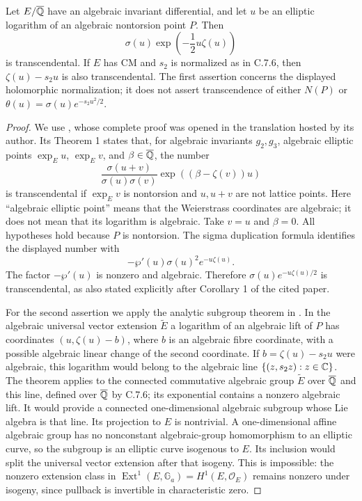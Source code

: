 \begin{statement}
Let $E/\overline{\mathbb Q}$ have an algebraic invariant differential,
and let $u$ be an elliptic logarithm of an algebraic nontorsion
point $P$. Then
\[
 \sigma(u)\exp\left(-\frac12u\zeta(u)\right)
\]
is transcendental. If $E$ has CM and $s_2$ is normalized as in
C.7.6, then $\zeta(u)-s_2u$ is also transcendental. The first
assertion concerns the displayed holomorphic normalization;
it does not assert transcendence of either $N(P)$ or
$\theta(u)=\sigma(u)e^{-s_2u^2/2}$.
\end{statement}
\begin{proof}
We use \citet[Theorem 1 and Corollary 1]{waldschmidt1979sigma},
whose complete proof was opened in the translation hosted by its
author. Its Theorem 1 states that, for algebraic invariants
$g_2,g_3$, algebraic elliptic points $\exp_Eu$, $\exp_Ev$, and
$\beta\in\overline{\mathbb Q}$, the number
\[
 \frac{\sigma(u+v)}{\sigma(u)\sigma(v)}
                      \exp((\beta-\zeta(v))u)
\]
is transcendental if $\exp_Ev$ is nontorsion and $u,u+v$
are not lattice points. Here ``algebraic elliptic point''
means that the Weierstrass coordinates are algebraic; it does
not mean that its logarithm is algebraic. Take $v=u$ and
$\beta=0$. All hypotheses hold because $P$ is nontorsion.
The sigma duplication formula identifies the displayed number
with
\[
 -\wp'(u)\sigma(u)^2e^{-u\zeta(u)}.
\]
The factor $-\wp'(u)$ is nonzero and algebraic. Therefore
$\sigma(u)e^{-u\zeta(u)/2}$ is transcendental, as also stated
explicitly after Corollary 1 of the cited paper.

For the second assertion we apply the analytic subgroup theorem
in \citet[Theorem 6.1]{huber2022}. In the algebraic universal
vector extension $\widetilde E$ a logarithm of an algebraic lift
of $P$ has coordinates $(u,\zeta(u)-b)$, where $b$ is an algebraic
fibre coordinate, with a possible algebraic linear change of the
second coordinate. If $b=\zeta(u)-s_2u$ were algebraic, this
logarithm would belong to the algebraic line
$\{(z,s_2z):z\in\mathbb C\}$. The theorem applies to the connected
commutative algebraic group $\widetilde E$ over
$\overline{\mathbb Q}$ and this line, defined over $\overline{\mathbb Q}$ by
C.7.6; its exponential contains a nonzero algebraic lift.
It would provide a connected one-dimensional algebraic subgroup
whose Lie algebra is that line. Its projection to $E$ is
nontrivial. A one-dimensional affine algebraic group has no
nonconstant algebraic-group homomorphism to an elliptic curve,
so the subgroup is an elliptic curve isogenous to $E$.
Its inclusion would split the universal vector extension after
that isogeny. This is impossible: the nonzero extension class in
$\operatorname{Ext}^1(E,\mathbb G_a)=H^1(E,\mathcal O_E)$
remains nonzero under isogeny, since pullback is invertible in
characteristic zero.
\end{proof}

